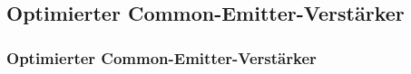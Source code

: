 \subsection{Optimierter Common-Emitter-Verstärker} %
\label{sub:Optimierter_Common-Emitter-Verstärker}
\begin{frame}
    \frametitle{Optimierter Common-Emitter-Verstärker}
    \framesubtitle{}
    
\end{frame}
